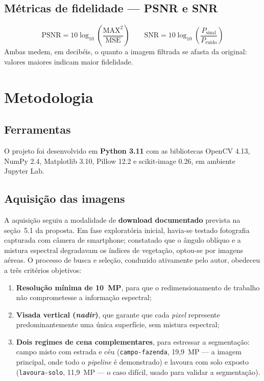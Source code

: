 \documentclass[12pt,a4paper]{article}
\begin{document}
\subsection{Métricas de fidelidade --- PSNR e SNR}
\begin{equation}
\text{PSNR} = 10\log_{10}\!\left(\frac{\text{MAX}^2}{\text{MSE}}\right)
\qquad
\text{SNR} = 10\log_{10}\!\left(\frac{P_{\text{sinal}}}{P_{\text{ruído}}}\right)
\end{equation}
Ambas medem, em decibéis, o quanto a imagem filtrada se afasta da original: valores maiores
indicam maior fidelidade.

\section{Metodologia}

\subsection{Ferramentas}
O projeto foi desenvolvido em \textbf{Python 3.11} com as bibliotecas OpenCV 4.13,
NumPy 2.4, Matplotlib 3.10, Pillow 12.2 e scikit-image 0.26, em ambiente Jupyter Lab.

\subsection{Aquisição das imagens}
A aquisição seguiu a modalidade de \textbf{download documentado} prevista na seção~5.1 da
proposta. Em fase exploratória inicial, havia-se testado fotografia capturada com câmera de
smartphone; constatado que o ângulo oblíquo e a mistura espectral degradavam os índices de
vegetação, optou-se por imagens aéreas. O processo de busca e seleção, conduzido ativamente
pelo autor, obedeceu a três critérios objetivos:

\begin{enumerate}
  \item \textbf{Resolução mínima de 10~MP}, para que o redimensionamento de trabalho não
        comprometesse a informação espectral;
  \item \textbf{Visada vertical (\emph{nadir})}, que garante que cada \emph{pixel} represente
        predominantemente uma única superfície, sem mistura espectral;
  \item \textbf{Dois regimes de cena complementares}, para estressar a segmentação: campo
        misto com estrada e céu (\texttt{campo-fazenda}, 19,9~MP --- a imagem principal, onde
        todo o \emph{pipeline} é demonstrado) e lavoura com solo exposto
        (\texttt{lavoura-solo}, 11,9~MP --- o caso difícil, usado para validar a segmentação).
\end{enumerate}
\end{document}
